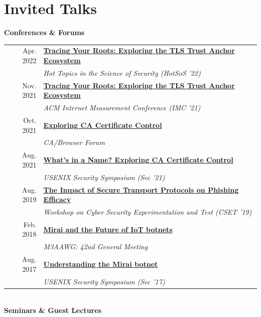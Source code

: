\documentclass[10pt,singlecolumn]{article} %
\begin{document}
\newpage 

\section{Invited Talks} 

\textbf{Conferences \& Forums}\\

\begin{tabular}{rl}
Apr. 2022 & \textbf{\href{https://cps-vo.org/node/82522}{Tracing Your Roots: Exploring the TLS Trust Anchor Ecosystem}}\\
& \emph{Hot Topics in the Science of Security (HotSoS '22)}\\
Nov. 2021 & \textbf{\href{https://zanema.com/videos/imc21-roots.mp4}{Tracing Your Roots: Exploring the TLS Trust Anchor Ecosystem}}\\
& \emph{ACM Internet Measurement Conference (IMC '21)} \\
Oct. 2021 & \textbf{\href{https://zanema.com/slides/cab_forum_ca_transparency.pdf}{Exploring CA Certificate Control}}\\
& \emph{CA/Browser Forum} \\
Aug. 2021 & \textbf{\href{https://www.youtube.com/watch?v=Aq1o8prmoyE}{What's in a Name? Exploring CA Certificate Control}} \\
& \emph{USENIX Security Symposium (Sec '21)} \\
Aug. 2019 & \textbf{\href{https://zanema.com/slides/cset-https-phishing-2019.pdf}{The Impact of Secure Transport Protocols on Phishing Efficacy}} \\
& \emph{Workshop on Cyber Security Experimentation and Test (CSET '19)} \\
Feb. 2018 & \textbf{\href{https://zanema.com/slides/m3aawg_mirai.pdf}{Mirai and the Future of IoT botnets}}\\
& \emph{M3AAWG: 42nd General Meeting} \\ 
Aug. 2017 & \textbf{\href{https://www.youtube.com/watch?v=1pywzRTJDaY}{Understanding the Mirai botnet}} \\
& \emph{USENIX Security Symposium (Sec '17)} \\ 
\end{tabular} \\

\vspace{0.3cm}
\textbf{Seminars \& Guest Lectures}\\
\end{document}
